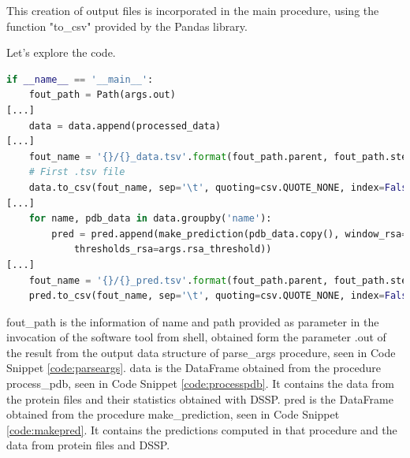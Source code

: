This creation of output files is incorporated in the main procedure, using the function "to\_csv" provided by the Pandas library. 

Let's explore the code.

\begin{lstlisting}[language=Python, caption=Creation of output files]
if __name__ == '__main__':
    fout_path = Path(args.out)
[...]
    data = data.append(processed_data)
[...]
    fout_name = '{}/{}_data.tsv'.format(fout_path.parent, fout_path.stem)
    # First .tsv file
    data.to_csv(fout_name, sep='\t', quoting=csv.QUOTE_NONE, index=False, float_format='%.3f')
[...]
    for name, pdb_data in data.groupby('name'):
        pred = pred.append(make_prediction(pdb_data.copy(), window_rsa=args.rsa_window,
            thresholds_rsa=args.rsa_threshold))
[...]
    fout_name = '{}/{}_pred.tsv'.format(fout_path.parent, fout_path.stem)
    pred.to_csv(fout_name, sep='\t', quoting=csv.QUOTE_NONE, index=False, float_format='%.3f')
\end{lstlisting}

fout\_path is the information of name and path provided as parameter in the invocation of the software tool from shell, obtained form the parameter .out of the result from the output data structure of parse\_args procedure, seen in Code Snippet \ref{code:parseargs}.
data is the DataFrame obtained from the procedure process\_pdb, seen in Code Snippet \ref{code:processpdb}. It contains the data from the protein files and their statistics obtained with DSSP.
pred is the DataFrame obtained from the procedure make\_prediction, seen in Code Snippet \ref{code:makepred}. It contains the predictions computed in that procedure and the data from protein files and DSSP.


